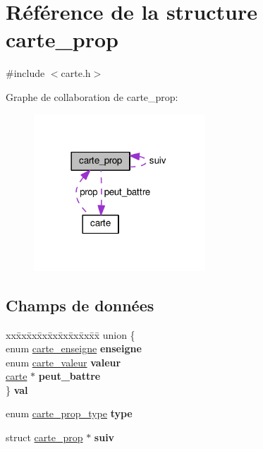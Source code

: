 \hypertarget{structcarte__prop}{}\section{Référence de la structure carte\+\_\+prop}
\label{structcarte__prop}


{\ttfamily \#include $<$carte.\+h$>$}



Graphe de collaboration de carte\+\_\+prop\+:\nopagebreak
\begin{figure}[H]
\begin{center}
\leavevmode
\includegraphics[width=182pt]{structcarte__prop__coll__graph}
\end{center}
\end{figure}
\subsection*{Champs de données}
\begin{DoxyCompactItemize}
\item 
\begin{tabbing}
xx\=xx\=xx\=xx\=xx\=xx\=xx\=xx\=xx\=\kill
union \{\\
\>enum \hyperlink{carte_8h_a2b6a5add5e3db9028dff54f9c1acdde7}{carte\_enseigne} {\bfseries enseigne}\\
\>enum \hyperlink{carte_8h_a323916cdb68cd0d5d8a1660ffb45ea4e}{carte\_valeur} {\bfseries valeur}\\
\>\hyperlink{structcarte}{carte} $\ast$ {\bfseries peut\_battre}\\
\} {\bfseries val}\hypertarget{structcarte__prop_a36e90757d299ff149c6884f54e18e84b}{}\label{structcarte__prop_a36e90757d299ff149c6884f54e18e84b}
\\

\end{tabbing}\item 
enum \hyperlink{carte_8h_a71a2818c25230a5e1a239f28c1e6deba}{carte\+\_\+prop\+\_\+type} {\bfseries type}\hypertarget{structcarte__prop_a434a5fe3ac234b8886126c4ea9acf243}{}\label{structcarte__prop_a434a5fe3ac234b8886126c4ea9acf243}

\item 
struct \hyperlink{structcarte__prop}{carte\+\_\+prop} $\ast$ {\bfseries suiv}\hypertarget{structcarte__prop_a0cb42544111674aa11728c2b7392a661}{}\label{structcarte__prop_a0cb42544111674aa11728c2b7392a661}

\end{DoxyCompactItemize}


